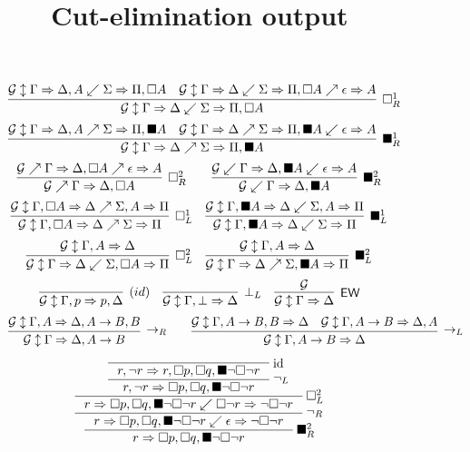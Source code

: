 \documentclass{article}
\title{Cut-elimination output}\date{}
\newcommand{\EW}{\mathsf{EW}}
\newcommand{\sa}{\Rightarrow}
\newcommand{\wbx}{\Box}
\newcommand{\bbx}{\blacksquare}
\newcommand{\fwd}{\nearrow}
\newcommand\bwd{\swarrow}
\newcommand\upd{\updownarrow}
\newcommand{\stt}[1][]{\stackrel{#1}{\Rightarrow}}
\newcommand{\seq}[2]{#1 \stt #2}
\newcommand{\idrl}{(id)}
\begin{document}
	
	\maketitle{}


\begin{figure}[h]
	\[
	\infer[\wbx_R^1]{\mathcal{G} \upd \Gamma \sa \Delta \bwd \Sigma
		\sa \Pi, \wbx A
	}
	{\mathcal{G} \upd \Gamma \sa \Delta, A \bwd \Sigma \sa \Pi, \wbx A
		&
		\mathcal{G} \upd \Gamma \sa \Delta \bwd \Sigma\sa \Pi, \wbx A \fwd
		\epsilon\sa A
	}
	\]
	\[
	\infer[\bbx_R^1]{\mathcal{G} \upd \Gamma \sa \Delta \fwd \Sigma
		\sa \Pi, \bbx A
	}
	{\mathcal{G} \upd \Gamma \sa \Delta, A \fwd \Sigma \sa \Pi, \bbx A
		&
		\mathcal{G} \upd \Gamma \sa \Delta \fwd \Sigma\sa \Pi, \bbx A \bwd
		\epsilon\sa A
	}
	\]
	\[
	\infer[\wbx_R^2]{\mathcal{G} \fwd \Gamma \sa \Delta, \wbx A
	}
	{\mathcal{G} \fwd \Gamma \sa \Delta, \wbx A \fwd \epsilon\sa A
	}
	\qquad
	\infer[\bbx_R^2]{\mathcal{G} \bwd \Gamma \sa \Delta, \bbx A
	}
	{\mathcal{G} \bwd \Gamma \sa \Delta, \bbx A \bwd \epsilon\sa A
	}
	\]
	\[
	\infer[\wbx_L^1]{\mathcal{G} \upd \Gamma, \wbx A \sa \Delta \fwd
		\Sigma \sa \Pi
	}
	{\mathcal{G} \upd \Gamma, \wbx A \sa \Delta \fwd
		\Sigma, A \sa \Pi
	}
	\quad
	\infer[\bbx_L^1]{\mathcal{G} \upd \Gamma, \bbx A \sa \Delta \bwd
		\Sigma \sa \Pi
	}
	{\mathcal{G} \upd \Gamma, \bbx A \sa \Delta \bwd
		\Sigma, A \sa \Pi
	}
	\]
	\[
	\infer[\wbx_L^2]{\mathcal{G} \upd \Gamma \sa \Delta \bwd
		\Sigma, \wbx A \sa \Pi
	}
	{\mathcal{G} \upd \Gamma, A \sa \Delta 
	}
	\quad
	\infer[\bbx_L^2]{\mathcal{G} \upd \Gamma \sa \Delta \fwd
		\Sigma, \bbx A \sa \Pi
	}
	{\mathcal{G} \upd \Gamma, A \sa \Delta 
	}
	\]
	\[
	\infer[\idrl]{\mathcal{G} \upd \Gamma, p \sa p, \Delta
	}
	{
	}
	\quad
	\infer[\bot_L]{\mathcal{G} \upd \Gamma, \bot \sa \Delta
	}
	{
	}
	\quad
	\infer[\EW]{\mathcal{G} \upd \Gamma \sa \Delta
	}
	{\mathcal{G}
	}
	\]
	\[
	\infer[\to_R]{\mathcal{G} \upd \Gamma \sa \Delta, A \to B
	}
	{\mathcal{G} \upd \Gamma, A \sa \Delta, A \to B, B
	}
	\qquad
	\infer[\to_L]{\mathcal{G} \upd \Gamma, A \to B \sa \Delta
	}
	{\mathcal{G} \upd \Gamma, A \to B, B \sa \Delta
		&
		\mathcal{G} \upd \Gamma, A \to B \sa \Delta, A
	}
	\]
\end{figure}


\begin{figure}[h]
	\[
	\AxiomC{~}
	\RightLabel{id}
	\UnaryInfC{
		$\seq{r, \lnot r}{r, \wbx p, \wbx q, \bbx \lnot\wbx\lnot r}$
	}
	\RightLabel{$\lnot_L$}
	\UnaryInfC{
		$\seq{r, \lnot r}{\wbx p, \wbx q, \bbx \lnot\wbx\lnot r}$
	}
	\RightLabel{$\wbx_L^2$}
	\UnaryInfC{
		$\seq{r}{\wbx p, \wbx q, \bbx \lnot\wbx\lnot r} \bwd \seq{\wbx \lnot
			r}{\lnot \wbx \lnot r}$
	}
	\RightLabel{$\lnot_R$}
	\UnaryInfC{
		$\seq{r}{\wbx p, \wbx q, \bbx \lnot\wbx\lnot r} \bwd \seq{\epsilon}{\lnot\wbx\lnot r}$
	}
	\RightLabel{$\bbx_R^2$}
	\UnaryInfC{$\seq{r}{\wbx p, \wbx q, \bbx \lnot\wbx\lnot r}$}
	\DisplayProof
	\]
\end{figure}
\end{document}
